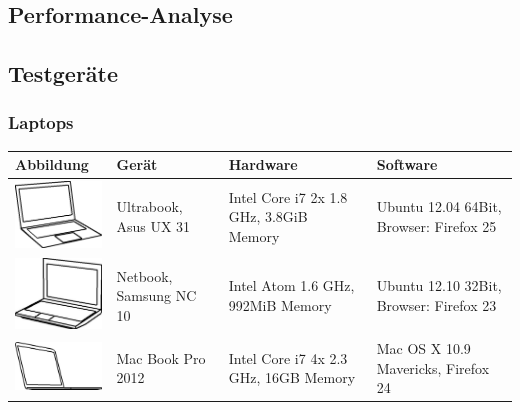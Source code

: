 \begin{landscape}

\chapter{Performance-Analyse}
	\label{performanceanalyse} 
	
	
	\section{Testgeräte}
	
		\subsection{Laptops}
		\begin{tabularx}{1.4\textwidth}{|l|XXX|}
			\hline
			\textbf{Abbildung} & \textbf{Gerät} & \textbf{Hardware} & \textbf{Software}\\
			\hline
			\includegraphics[width=3cm]{../performanceAnalaysis/devices/asusux21.png} &
			Ultrabook, Asus UX 31 & Intel Core i7 2x 1.8 GHz, 3.8GiB Memory & Ubuntu 12.04 64Bit, Browser: Firefox 25 \\
			\hline
			\includegraphics[width=3cm]{../performanceAnalaysis/devices/samsungnc10.jpg} & Netbook, Samsung NC 10 & Intel Atom 1.6 GHz, 992MiB Memory & Ubuntu 12.10 32Bit, Browser: Firefox 23 \\
			\hline
			\includegraphics[width=3cm]{../performanceAnalaysis/devices/macbookpro.jpg} & Mac Book Pro 2012 & Intel Core i7 4x 2.3 GHz, 16GB Memory & Mac OS X 10.9 Mavericks, Firefox 24 \\
			\hline
		\end{tabularx}
		

\end{landscape}
